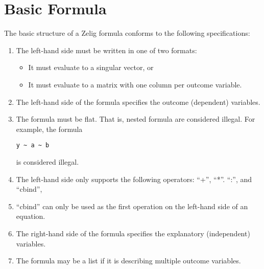 \documentclass{article}
\begin{document}
\section{Basic Formula}

The basic structure of a Zelig formula conforms to the following specifications:

\begin{enumerate}
  \item The left-hand side must be written in one of two formats:
    \begin{itemize}
      \item It must evaluate to a singular vector, or
      \item It must evaluate to a matrix with one column per outcome variable.
    \end{itemize}
  \item The left-hand side of the formula specifies the outcome (dependent) variables.
  \item The formula must be flat. That is, nested formula are considered
    illegal. For example, the formula \begin{verbatim}y ~ a ~ b\end{verbatim} is considered illegal.
  \item The left-hand side only supports the following operators: ``+'', ``*''. ``:'', and ``cbind'',
  \item ``cbind'' can only be used as the first operation on the left-hand side of an equation.
  \item The right-hand side of the formula specifies the explanatory (independent) variables.
  \item The formula may be a list if it is describing multiple outcome variables.
\end{enumerate}
\end{document}
